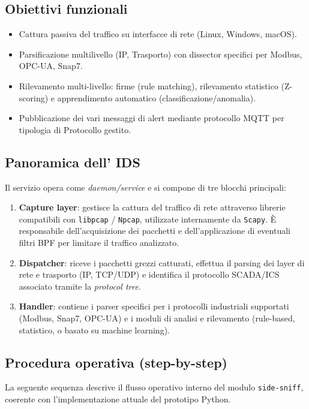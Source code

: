 \subsection{Obiettivi funzionali}
\begin{itemize}
  \item Cattura passiva del traffico su interfacce di rete (Linux, Windows, macOS).
  \item Parsificazione multilivello (IP, Trasporto) con dissector specifici per Modbus, OPC-UA, Snap7.
  \item Rilevamento multi-livello: firme (rule matching), rilevamento statistico (Z-scoring) e apprendimento automatico (classificazione/anomalia).
  \item Pubblicazione dei vari messaggi di alert mediante protocollo MQTT per tipologia di Protocollo gestito.
\end{itemize}

\subsection{Panoramica dell' IDS}
Il servizio opera come \textit{daemon/service} e si compone di tre blocchi principali:
\begin{enumerate}
  \item \textbf{Capture layer}: gestisce la cattura del traffico di rete attraverso librerie compatibili con \texttt{libpcap} / \texttt{Npcap}, utilizzate internamente da \texttt{Scapy}. È responsabile dell’acquisizione dei pacchetti e dell’applicazione di eventuali filtri BPF per limitare il traffico analizzato.
  \item \textbf{Dispatcher}: riceve i pacchetti grezzi catturati, effettua il parsing dei layer di rete e trasporto (IP, TCP/UDP) e identifica il protocollo SCADA/ICS associato tramite la \textit{protocol tree}.
  \item \textbf{Handler}: contiene i parser specifici per i protocolli industriali supportati (Modbus, Snap7, OPC-UA) e i moduli di analisi e rilevamento (rule-based, statistico, o basato su machine learning).
\end{enumerate}

\subsection{Procedura operativa (step-by-step)}
La seguente sequenza descrive il flusso operativo interno del modulo \texttt{side-sniff}, coerente con l’implementazione attuale del prototipo Python.

